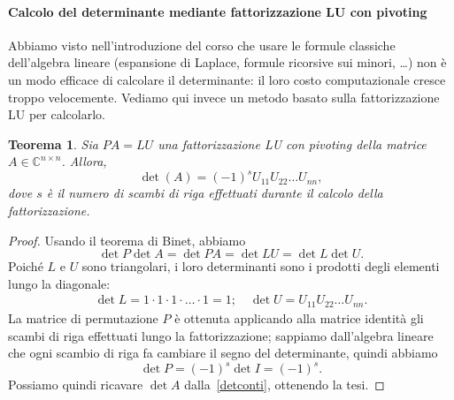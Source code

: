 \documentclass[a4paper]{report}
\newtheorem{theorem}{Teorema}[chapter]
\theoremstyle{definiton}
\theoremstyle{remark}
\begin{document}
\paragraph{Calcolo del determinante mediante fattorizzazione LU con pivoting} Abbiamo visto nell'introduzione del corso che usare le formule classiche dell'algebra lineare (espansione di Laplace, formule ricorsive sui minori, \dots) non è un modo efficace di calcolare il determinante: il loro costo computazionale cresce troppo velocemente. Vediamo qui invece un metodo basato sulla fattorizzazione LU per calcolarlo.

\begin{theorem}
Sia $PA = LU$ una fattorizzazione LU con pivoting della matrice $A \in \mathbb{C}^{n \times n}$. Allora,
\[
\det(A) = (-1)^s U_{11} U_{22} \dots U_{nn},
\]
dove $s$ è il numero di scambi di riga effettuati durante il calcolo della fattorizzazione.
\end{theorem}
\begin{proof}
Usando il teorema di Binet, abbiamo
\begin{equation} \label{detconti}
    \det P \det A = \det PA = \det LU = \det L \det U.    
\end{equation}
Poiché $L$ e $U$ sono triangolari, i loro determinanti sono i prodotti degli elementi lungo la diagonale:
\begin{align*}
\det L = 1 \cdot 1 \cdot 1 \cdot \dots \cdot 1 = 1; \quad
\det U = U_{11} U_{22} \dots U_{nn}.
\end{align*}
La matrice di permutazione $P$ è ottenuta applicando alla matrice identità gli scambi di riga effettuati lungo la fattorizzazione; sappiamo dall'algebra lineare che ogni scambio di riga fa cambiare il segno del determinante, quindi abbiamo
\[
\det P = (-1)^s \det I = (-1)^s.
\]
Possiamo quindi ricavare $\det A$ dalla~\eqref{detconti}, ottenendo la tesi.
\end{proof}
\end{document}
